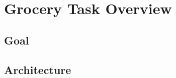 \documentclass[main.tex]{subfiles}
\begin{document}
	
	\begingroup
	
	\renewcommand{\cleardoublepage}{}
	
	\renewcommand{\clearpage}{}
	
	\chapter{Grocery Task Overview}
	
	
	\chapterauthor{}
	
	\section{Goal}
	
	\section{Architecture}
	
\end{document}
